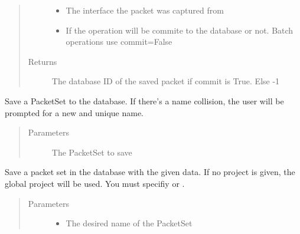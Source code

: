 \documentclass[letterpaper,10pt,english]{sphinxmanual}
\begin{document}
\begin{fulllineitems}
\begin{fulllineitems}
\begin{quote}
\begin{description}
\begin{itemize}
\item {} 
 \textendash{} The interface the packet was captured from

\item {} 
 \textendash{} If the operation will be commite to the database or not. Batch operations use commit=False

\end{itemize}

\item[{Returns}] \leavevmode
The database ID of the saved packet if commit is True. Else -1

\end{description}\end{quote}

\end{fulllineitems}


\begin{fulllineitems}
\label{\detokenize{src:src.Database.Database.savePacketSet}}
Save a PacketSet to the database.
If there’s a name collision, the user will be prompted for a new and unique name.
\begin{quote}\begin{description}
\item[{Parameters}] \leavevmode
{} \textendash{} The PacketSet to save

\end{description}\end{quote}

\end{fulllineitems}


\begin{fulllineitems}
\label{\detokenize{src:src.Database.Database.savePacketSetWithData}}
Save a packet set in the database with the given data.
If no project is given, the global project will be used.
You must specifiy  or .
\begin{quote}\begin{description}
\item[{Parameters}] \leavevmode\begin{itemize}
\item {} 
 \textendash{} The desired name of the PacketSet


\end{itemize}
\end{description}
\end{quote}
\end{fulllineitems}
\end{fulllineitems}
\end{document}
